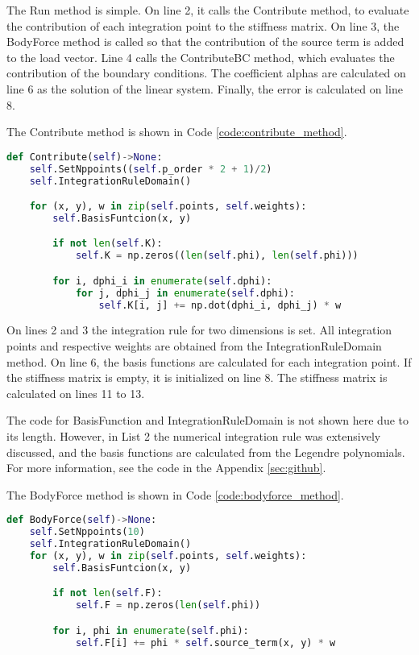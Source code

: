 The Run method is simple. On line 2, it calls the Contribute method, to evaluate the contribution of each integration point to the stiffness matrix. On line 3, the BodyForce method is called so that the contribution of the source term is added to the load vector. Line 4 calls the ContributeBC method, which evaluates the contribution of the boundary conditions. The coefficient alphas are calculated on line 6 as the solution of the linear system. Finally, the error is calculated on line 8.

The Contribute method is shown in Code \ref{code:contribute_method}.
\begin{lstlisting}[caption={Contribute method},label={code:contribute_method},language=python]
def Contribute(self)->None:
    self.SetNppoints((self.p_order * 2 + 1)/2)
    self.IntegrationRuleDomain()

    for (x, y), w in zip(self.points, self.weights):
        self.BasisFuntcion(x, y)

        if not len(self.K):
            self.K = np.zeros((len(self.phi), len(self.phi)))

        for i, dphi_i in enumerate(self.dphi):
            for j, dphi_j in enumerate(self.dphi):
                self.K[i, j] += np.dot(dphi_i, dphi_j) * w
\end{lstlisting}

On lines 2 and 3 the integration rule for two dimensions is set. All integration points and respective weights are obtained from the IntegrationRuleDomain method. On line 6, the basis functions are calculated for each integration point. If the stiffness matrix is empty, it is initialized on line 8. The stiffness matrix is calculated on lines 11 to 13. 

The code for BasisFunction and IntegrationRuleDomain is not shown here due to its length. However, in List 2 the numerical integration rule was extensively discussed, and the basis functions are calculated from the Legendre polynomials. For more information, see the code in the Appendix \ref{sec:github}.

The BodyForce method is shown in Code \ref{code:bodyforce_method}.
\begin{lstlisting}[caption={BodyForce method},label={code:bodyforce_method},language=python]
def BodyForce(self)->None:
    self.SetNppoints(10)
    self.IntegrationRuleDomain()
    for (x, y), w in zip(self.points, self.weights):
        self.BasisFuntcion(x, y)

        if not len(self.F):
            self.F = np.zeros(len(self.phi))

        for i, phi in enumerate(self.phi): 
            self.F[i] += phi * self.source_term(x, y) * w
\end{lstlisting}

